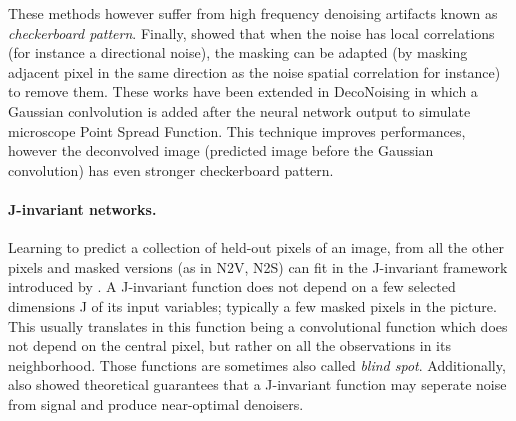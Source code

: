\documentclass{article}
\begin{document}
These methods however suffer from high frequency denoising artifacts known as \textit{checkerboard pattern}. Finally, \cite{broaddus2020removing} showed that when the noise has  local correlations (for instance a  directional noise), the masking can be adapted (by masking adjacent pixel in the same direction as the noise spatial correlation for instance) to remove them. These works have been extended in DecoNoising \cite{goncharova2020} in which a Gaussian conlvolution is added after the neural network output to simulate microscope Point Spread Function. This technique improves performances, however the deconvolved image (predicted image before the Gaussian convolution) has even stronger checkerboard pattern.

\paragraph{J-invariant networks.}
Learning to predict a collection of held-out pixels of an image, from all the other pixels and masked versions (as in N2V, N2S) can fit in the J-invariant framework introduced by \cite{batson2019noise2self}.
A J-invariant function does not depend on a few selected dimensions J of its input variables; typically a few masked pixels
in the picture.
This usually translates in this function being a convolutional function which does not depend on the central pixel, but rather on all the observations in its neighborhood. Those functions are sometimes also called \textit{blind spot}.
 Additionally, \cite{batson2019noise2self} also showed theoretical guarantees that a J-invariant function may seperate noise from signal and produce near-optimal denoisers.
\end{document}
